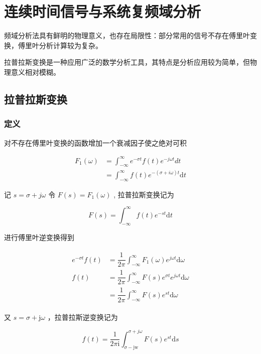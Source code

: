 \documentclass[cn,11pt,chinese,black,simple]{../elegantbook}
\begin{document}
\fi 


\chapter{连续时间信号与系统复频域分析}

频域分析法具有鲜明的物理意义，也存在局限性：部分常用的信号不存在傅里叶变换，傅里叶分析计算较为复杂。

拉普拉斯变换是一种应用广泛的数学分析工具，其特点是分析应用较为简单，但物理意义相对模糊。

\section{拉普拉斯变换}

\subsection{定义}

对不存在傅里叶变换的函数增加一个衰减因子使之绝对可积

\[
\begin{aligned}
    F_{1}(\omega)&=\int_{-\infty}^{\infty} e^{-\sigma t} f(t) e^{-j \omega t} d t \\
    &=\int_{-\infty}^{\infty} f(t) e^{-(\sigma+i \omega) t} \mathrm{d} t
\end{aligned}    
\]

记 \(s = \sigma + j \omega\) 令 \(F(s) = F_1(\omega)\) , 拉普拉斯变换记为

\[
F(s)=\int_{-\infty}^{\infty} f(t) e^{-s t} \mathrm{d} t
\]

进行傅里叶逆变换得到

\[
\begin{array}{l}
\begin{aligned}
    e^{-\sigma t} f(t)&=\dfrac{1}{2 \pi} \int_{-\infty}^{\infty} F_{1}(\omega) e^{j \omega t} \mathrm{d} \omega \\
f(t) &=\dfrac{1}{2 \pi} \int_{-\infty}^{\infty} F(s) e^{\sigma t} e^{j \omega t} \mathrm{d} \omega \\
&=\dfrac{1}{2 \pi} \int_{-\infty}^{\infty} F(s) e^{s t} \mathrm{d} \omega
\end{aligned}
\end{array}
\]

又 $s=\sigma+\mathrm{j} \omega$ ，拉普拉斯逆变换记为

\[
f(t)=\dfrac{1}{2 \pi \mathrm{i}} \int_{\sigma-\mathrm{jw}}^{\sigma+j \omega} F(s) e^{s t} \mathrm{d} s
\]
\end{document}
